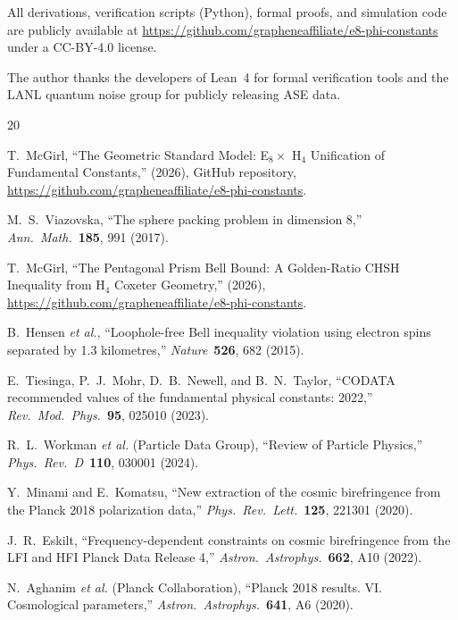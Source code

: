\documentclass[aps,prl,twocolumn,superscriptaddress,nofootinbib]{revtex4-2}
\begin{document}
All derivations, verification scripts (Python), formal proofs, and
simulation code are publicly available at
\url{https://github.com/grapheneaffiliate/e8-phi-constants}
under a CC-BY-4.0 license.

\begin{acknowledgments}
The author thanks the developers of Lean~4 for formal verification tools
and the LANL quantum noise group for publicly releasing ASE data.
\end{acknowledgments}

\begin{thebibliography}{20}

T.~McGirl,
``The Geometric Standard Model: E$_8 \times$ H$_4$ Unification of
Fundamental Constants,''
(2026), GitHub repository,
\url{https://github.com/grapheneaffiliate/e8-phi-constants}.

M.~S.~Viazovska,
``The sphere packing problem in dimension 8,''
\emph{Ann.\ Math.}\ \textbf{185}, 991 (2017).

T.~McGirl,
``The Pentagonal Prism Bell Bound: A Golden-Ratio CHSH Inequality
from H$_4$ Coxeter Geometry,''
(2026), \url{https://github.com/grapheneaffiliate/e8-phi-constants}.

B.~Hensen \emph{et al.},
``Loophole-free Bell inequality violation using electron spins
separated by 1.3 kilometres,''
\emph{Nature}\ \textbf{526}, 682 (2015).

E.~Tiesinga, P.~J.~Mohr, D.~B.~Newell, and B.~N.~Taylor,
``CODATA recommended values of the fundamental physical constants: 2022,''
\emph{Rev.\ Mod.\ Phys.}\ \textbf{95}, 025010 (2023).

R.~L.~Workman \emph{et al.} (Particle Data Group),
``Review of Particle Physics,''
\emph{Phys.\ Rev.\ D}\ \textbf{110}, 030001 (2024).

Y.~Minami and E.~Komatsu,
``New extraction of the cosmic birefringence from the Planck 2018
polarization data,''
\emph{Phys.\ Rev.\ Lett.}\ \textbf{125}, 221301 (2020).

J.~R.~Eskilt,
``Frequency-dependent constraints on cosmic birefringence from the
LFI and HFI Planck Data Release 4,''
\emph{Astron.\ Astrophys.}\ \textbf{662}, A10 (2022).

N.~Aghanim \emph{et al.} (Planck Collaboration),
``Planck 2018 results. VI. Cosmological parameters,''
\emph{Astron.\ Astrophys.}\ \textbf{641}, A6 (2020).


\end{thebibliography}
\end{document}
